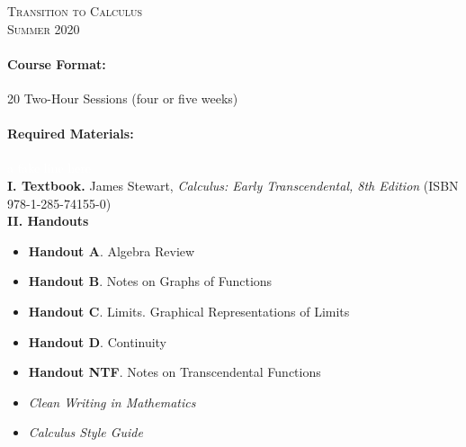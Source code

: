 \documentclass[11pt]{exam}
\newcommand{\afakeline}{\textcolor{white}{a fake line here}}
\begin{document}
\begin{center}
{\large 
\textsc{ 
Transition to Calculus}}\\
\textsc{Summer 2020}\\[1em]
\end{center}

\smallskip

\paragraph{Course Format:} 20 Two-Hour Sessions (four or five weeks)

\paragraph{Required Materials:}\afakeline\\[0.5em]
\textbf{I. Textbook.} James Stewart, \textit{Calculus: Early Transcendental, 8th Edition} (ISBN 978-1-285-74155-0) \\[0.5em]
\textbf{II. Handouts} 
\begin{itemize}
    \item{\bf Handout A}. Algebra Review
    \item{\bf Handout B}. Notes on Graphs of Functions
    \item{\bf Handout C}. Limits. Graphical Representations of Limits
    \item{\bf Handout D}. Continuity
    \item{\bf Handout NTF}. Notes on Transcendental Functions
    \item {\em Clean Writing in Mathematics}
    \item {\em Calculus Style Guide}
\end{itemize}
\end{document}
